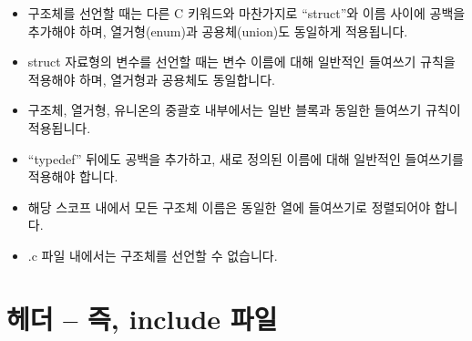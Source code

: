 \documentclass{42-ko}
\begin{document}
        \begin{itemize}

            \item 구조체를 선언할 때는 다른 C 키워드와 마찬가지로 ``struct''와 
              이름 사이에 공백을 추가해야 하며, 열거형(enum)과 공용체(union)도 
              동일하게 적용됩니다.

            \item struct 자료형의 변수를 선언할 때는 변수 이름에 대해 일반적인 
              들여쓰기 규칙을 적용해야 하며, 열거형과 공용체도 동일합니다.

            \item 구조체, 열거형, 유니온의 중괄호 내부에서는 일반 블록과 
              동일한 들여쓰기 규칙이 적용됩니다.

            \item ``typedef'' 뒤에도 공백을 추가하고, 새로 정의된 이름에 대해 
              일반적인 들여쓰기를 적용해야 합니다.

            \item 해당 스코프 내에서 모든 구조체 이름은 동일한 열에 들여쓰기로 
              정렬되어야 합니다.

            \item .c 파일 내에서는 구조체를 선언할 수 없습니다.

        \end{itemize}
        \newpage


    \section{헤더 – 즉, include 파일}
\end{document}
